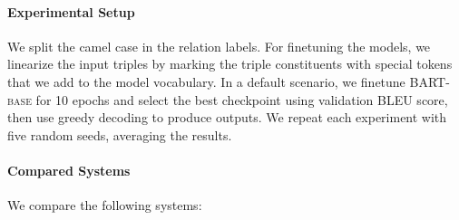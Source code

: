 \paragraph{Experimental Setup} We split the camel case in the relation labels. For finetuning the models, we linearize the input triples by marking the triple constituents with special tokens that we add to the model vocabulary. In a default scenario, we finetune BART\textsc{-base} for 10 epochs and select the best checkpoint using validation BLEU score, then use greedy decoding to produce outputs. We repeat each experiment with five random seeds, averaging the results.


\paragraph{Compared Systems} We compare the following systems:
